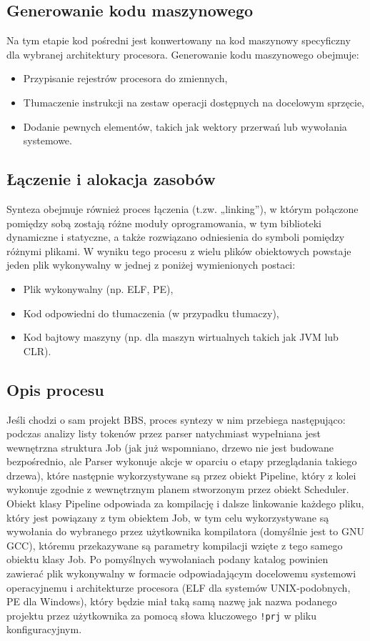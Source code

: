 \subsection{Generowanie kodu maszynowego}
Na tym etapie kod pośredni jest konwertowany na kod maszynowy specyficzny dla wybranej architektury procesora. Generowanie kodu maszynowego obejmuje:

\begin{itemize}
    \item Przypisanie rejestrów procesora do zmiennych,
    \item Tłumaczenie instrukcji na zestaw operacji dostępnych na docelowym sprzęcie,
    \item Dodanie pewnych elementów, takich jak wektory przerwań lub wywołania systemowe.
\end{itemize}

\subsection{Łączenie i alokacja zasobów}
Synteza obejmuje również proces łączenia (t.zw. „linking”), w którym połączone pomiędzy sobą zostają różne moduły oprogramowania, w tym biblioteki dynamiczne i statyczne, a także rozwiązano odniesienia do symboli pomiędzy różnymi plikami. W wyniku tego procesu z wielu plików obiektowych powstaje jeden plik wykonywalny w jednej z poniżej wymienionych postaci:

\begin{itemize}
    \item Plik wykonywalny (np. ELF, PE),
    \item Kod odpowiedni do tłumaczenia (w przypadku tłumaczy),
    \item Kod bajtowy maszyny (np. dla maszyn wirtualnych takich jak JVM lub CLR).
\end{itemize}

\subsection{Opis procesu}

Jeśli chodzi o sam projekt BBS, proces syntezy w nim przebiega następująco: podczas analizy listy tokenów przez parser natychmiast wypełniana jest wewnętrzna struktura Job (jak już wspomniano, drzewo nie jest budowane bezpośrednio, ale Parser wykonuje akcje w oparciu o etapy przeglądania takiego drzewa), które następnie wykorzystywane są przez obiekt Pipeline, który z kolei wykonuje zgodnie z wewnętrznym planem stworzonym przez obiekt Scheduler. Obiekt klasy Pipeline odpowiada za kompilację i dalsze linkowanie każdego pliku, który jest powiązany z tym obiektem Job, w tym celu wykorzystywane są wywołania do wybranego przez użytkownika kompilatora (domyślnie jest to GNU GCC), któremu przekazywane są parametry kompilacji wzięte z tego samego obiektu klasy Job. Po pomyślnych wywołaniach podany katalog powinien zawierać plik wykonywalny w formacie odpowiadającym docelowemu systemowi operacyjnemu i architekturze procesora (ELF dla systemów UNIX-podobnych, PE dla Windows), który będzie miał taką samą nazwę jak nazwa podanego projektu przez użytkownika za pomocą słowa kluczowego \texttt{!prj} w pliku konfiguracyjnym.

